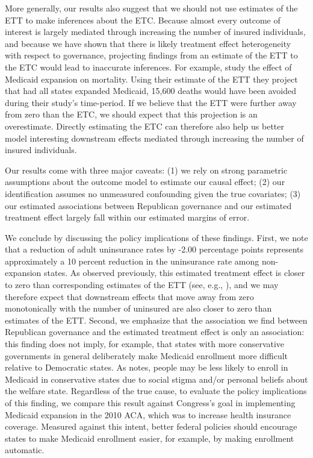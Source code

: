 \documentclass{article}
\begin{document}
More generally, our results also suggest that we should not use estimates of the ETT to make inferences about the ETC. Because almost every outcome of interest is largely mediated through increasing the number of insured individuals, and because we have shown that there is likely treatment effect heterogeneity with respect to governance, projecting findings from an estimate of the ETT to the ETC would lead to inaccurate inferences. For example, \cite{miller2019medicaid} study the effect of Medicaid expansion on mortality. Using their estimate of the ETT they project that had all states expanded Medicaid, 15,600 deaths would have been avoided during their study's time-period. If we believe that the ETT were further away from zero than the ETC, we should expect that this projection is an overestimate. Directly estimating the ETC can therefore also help us better model interesting downstream effects mediated through increasing the number of insured individuals. 

Our results come with three major caveats: (1) we rely on strong parametric assumptions about the outcome model to estimate our causal effect; (2) our identification assumes no unmeasured confounding given the true covariates; (3) our estimated associations between Republican governance and our estimated treatment effect largely fall within our estimated margins of error. 

We conclude by discussing the policy implications of these findings. First, we note that a reduction of adult uninsurance rates by -2.00 percentage points represents approximately a 10 percent reduction in the uninsurance rate among non-expansion states. As observed previously, this estimated treatment effect is closer to zero than corresponding estimates of the ETT (see, e.g., \cite{courtemanche2017early}), and we may therefore expect that downstream effects that move away from zero monotonically with the number of uninsured are also closer to zero than estimates of the ETT. Second, we emphasize that the association we find between Republican governance and the estimated treatment effect is only an association: this finding does not imply, for example, that states with more conservative governments in general deliberately make Medicaid enrollment more difficult relative to Democratic states. As \cite{sommers2012understanding} notes, people may be less likely to enroll in Medicaid in conservative states due to social stigma and/or personal beliefs about the welfare state. Regardless of the true cause, to evaluate the policy implications of this finding, we compare this result against Congress's goal in implementing Medicaid expansion in the 2010 ACA, which was to increase health insurance coverage. Measured against this intent, better federal policies should encourage states to make Medicaid enrollment easier, for example, by making enrollment automatic. 
\end{document}
